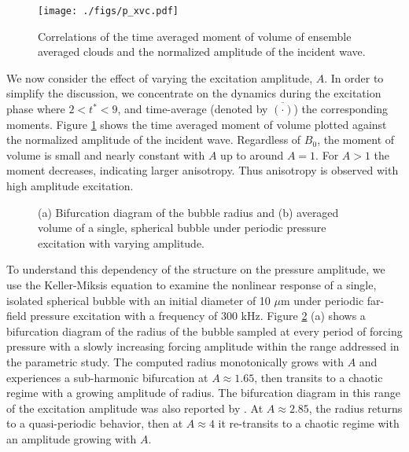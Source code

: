 \documentclass{jfm}
\begin{document}
\begin{figure}
  \center
  \texttt{[image: ./figs/p\_xvc.pdf]}
  \caption{Correlations of the time averaged moment of volume of ensemble averaged clouds and the normalized amplitude of the incident wave.}
   \label{fig:p_xvc} 
\end{figure}
We now consider the effect of varying the excitation amplitude, $A$.
In order to simplify the discussion, we concentrate on the dynamics during the excitation phase where $2 < t^* < 9$, and time-average (denoted by $\overline{(\cdot)}$) the corresponding moments.
Figure \ref{fig:p_xvc} shows the time averaged moment of volume plotted against the normalized amplitude of the incident wave.
Regardless of $B_0$, the moment of volume is small and nearly constant with $A$ up to around $A=1$. For $A >1$ the moment decreases, indicating larger anisotropy.  Thus anisotropy is observed with high amplitude excitation.

\begin{figure}
  \center
  \caption{(a) Bifurcation diagram of the bubble radius and (b) averaged volume of a single, spherical bubble under periodic pressure excitation with varying amplitude.
   }
   \label{fig:bif}
\end{figure}
To understand this dependency of the structure on the pressure amplitude, we use the Keller-Miksis equation to examine the nonlinear response of a single, isolated spherical bubble with an initial diameter of 10 $\mu$m under periodic far-field pressure excitation with a frequency of 300 kHz.
Figure \ref{fig:bif} (a) shows a bifurcation diagram of the radius of the bubble sampled at every period of forcing pressure with a slowly increasing forcing amplitude within the range addressed in the parametric study.
The computed radius monotonically grows with $A$ and experiences a sub-harmonic bifurcation at $A\approx1.65$, then transits to a chaotic regime with a growing amplitude of radius. The bifurcation diagram in this range of the excitation amplitude was also reported by \citet{Preston07}.
At $A\approx2.85$, the radius returns to a quasi-periodic behavior, then at $A\approx4$ it re-transits to a chaotic regime with an amplitude growing with $A$.
\end{document}
